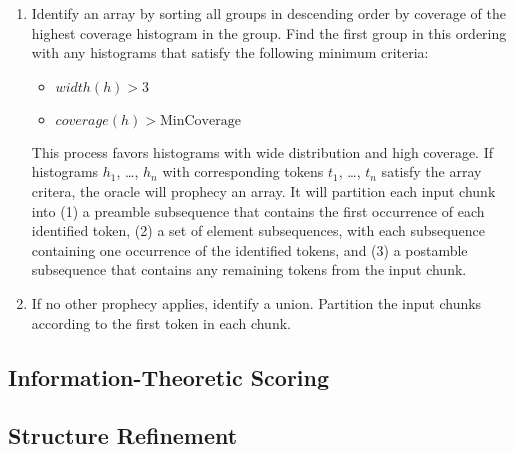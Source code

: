\begin {enumerate}
\item Identify an array by sorting all groups in descending 
order by coverage of the highest coverage histogram in the group.
Find the first group in this ordering with any histograms that satisfy
the following minimum criteria:
\begin {itemize}
\item $\mathit{width}(h) > 3$
\item $\mathit{coverage}(h) > \mathrm{MinCoverage}$
\end{itemize}
This process favors histograms with wide distribution and high coverage.
If histograms $h_1$, \ldots, $h_n$ with corresponding tokens 
$t_1$, \ldots, $t_n$ satisfy the array critera, the oracle will
prophecy an array.   It will 
partition each input chunk into (1) a preamble subsequence 
that contains the first occurrence of each identified token, 
(2) a set of element subsequences, with each subsequence containing
one occurrence of the identified tokens, and
(3) a postamble subsequence that contains any remaining tokens from
the input chunk.

\item If no other prophecy applies, identify a union. Partition
  the input chunks according to the first token in each chunk. 
\end{enumerate}


\subsection {Information-Theoretic Scoring}
\label{sec:score}



\subsection {Structure Refinement}

%


